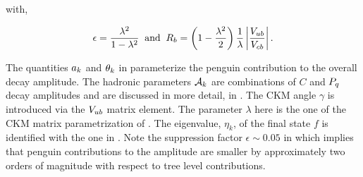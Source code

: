 \noindent with,

\begin{equation}
  \epsilon = \frac{\lambda^2}{1-\lambda^2} \;\;\text{and} \;\;  R_b = \left( 1-\frac{\lambda^2}{2} \right) \frac{1}{\lambda} \left| \frac{V_{ub}}{V_{cb}} \right|.
  \label{bsjpsiphi_amp_param_defs_II}
\end{equation}

\noindent The quantities $a_k$ and $\theta_k$ in  parameterize the penguin
contribution to the overall \BsJpsiPhi decay amplitude. The hadronic parameters $\mathcal{A}_{k}$ are combinations
of $C$ and $P_q$ decay amplitudes and are discussed in more detail, in .
The CKM angle $\gamma$ is introduced via the $V_{ub}$ matrix element.
The parameter $\lambda$ here is the one of the CKM matrix parametrization of .
The eigenvalue, $\eta_k$, of the final state $f$ is identified with the one in .
Note the suppression factor $\epsilon \sim 0.05$ in  which implies that penguin contributions
to the \BsJpsiPhi amplitude are smaller by approximately two orders of magnitude with respect to tree level contributions.

